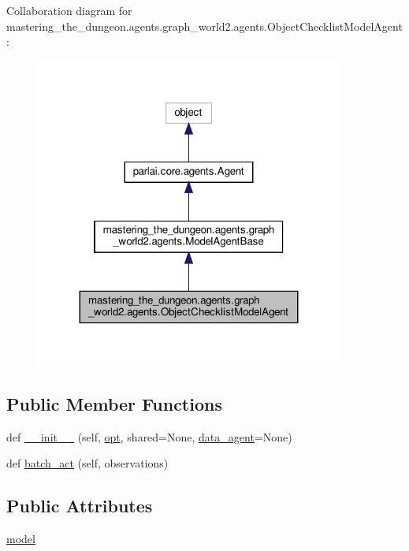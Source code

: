 Collaboration diagram for mastering\+\_\+the\+\_\+dungeon.\+agents.\+graph\+\_\+world2.\+agents.\+Object\+Checklist\+Model\+Agent\+:
\nopagebreak
\begin{figure}[H]
\begin{center}
\leavevmode
\includegraphics[width=287pt]{classmastering__the__dungeon_1_1agents_1_1graph__world2_1_1agents_1_1ObjectChecklistModelAgent__coll__graph}
\end{center}
\end{figure}
\subsection*{Public Member Functions}
\begin{DoxyCompactItemize}
\item 
def \hyperlink{classmastering__the__dungeon_1_1agents_1_1graph__world2_1_1agents_1_1ObjectChecklistModelAgent_a049d12518cbbcbda34b58f40d7aecfc7}{\+\_\+\+\_\+init\+\_\+\+\_\+} (self, \hyperlink{classparlai_1_1core_1_1agents_1_1Agent_ab3b45d2754244608c75d4068b90cd051}{opt}, shared=None, \hyperlink{classmastering__the__dungeon_1_1agents_1_1graph__world2_1_1agents_1_1ModelAgentBase_a3c6da213b730abbba55d22aed93ab5ad}{data\+\_\+agent}=None)
\item 
def \hyperlink{classmastering__the__dungeon_1_1agents_1_1graph__world2_1_1agents_1_1ObjectChecklistModelAgent_a63f393cbab394c68f64437b2a280a8bf}{batch\+\_\+act} (self, observations)
\end{DoxyCompactItemize}
\subsection*{Public Attributes}
\begin{DoxyCompactItemize}
\item 
\hyperlink{classmastering__the__dungeon_1_1agents_1_1graph__world2_1_1agents_1_1ObjectChecklistModelAgent_a1386b1bf65f5b7a710d8ca13cfa7fafb}{model}
\end{DoxyCompactItemize}


